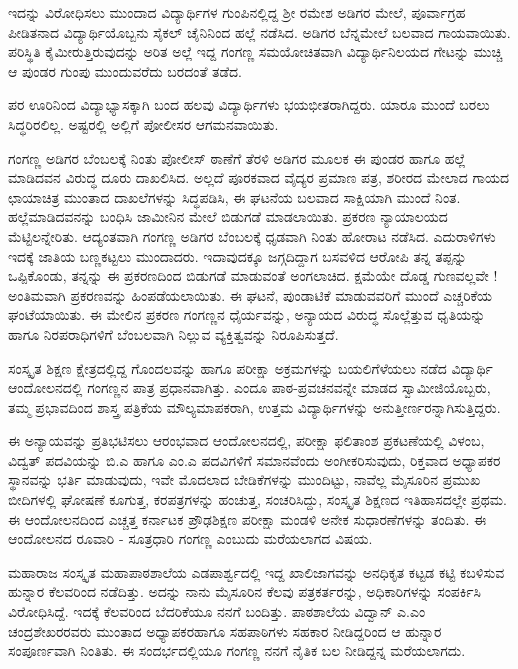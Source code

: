 ಇದನ್ನು ವಿರೋಧಿಸಲು ಮುಂದಾದ ವಿದ್ಯಾರ್ಥಿಗಳ ಗುಂಪಿನಲ್ಲಿದ್ದ ಶ್ರೀ ರಮೇಶ ಅಡಿಗರ ಮೇಲೆ, ಪೂರ್ವಾಗ್ರಹ ಪೀಡಿತನಾದ ವಿದ್ಯಾರ್ಥಿಯೊಬ್ಬನು ಸೈಕಲ್ ಚೈನಿನಿಂದ ಹಲ್ಲೆ ನಡೆಸಿದ. ಅಡಿಗರ ಬೆನ್ನಮೇಲೆ ಬಲವಾದ ಗಾಯವಾಯಿತು. ಪರಿಸ್ಥಿತಿ ಕೈಮೀರುತ್ತಿರುವುದನ್ನು ಅರಿತ ಅಲ್ಲೆ ಇದ್ದ ಗಂಗಣ್ಣ ಸಮಯೋಚಿತವಾಗಿ ವಿದ್ಯಾರ್ಥಿನಿಲಯದ ಗೇಟನ್ನು ಮುಚ್ಚಿ ಆ ಪುಂಡರ ಗುಂಪು ಮುಂದುವರೆದು ಬರದಂತೆ ತಡೆದ.

ಪರ ಊರಿನಿಂದ ವಿದ್ಯಾಭ್ಯಾಸಕ್ಕಾಗಿ ಬಂದ ಹಲವು ವಿದ್ಯಾರ್ಥಿಗಳು ಭಯಭೀತರಾಗಿದ್ದರು. ಯಾರೂ ಮುಂದೆ ಬರಲು ಸಿದ್ಧರಿರಲಿಲ್ಲ. ಅಷ್ಟರಲ್ಲಿ ಅಲ್ಲಿಗೆ ಪೋಲೀಸರ ಆಗಮನವಾಯಿತು. 

ಗಂಗಣ್ಣ ಅಡಿಗರ ಬೆಂಬಲಕ್ಕೆ ನಿಂತು ಪೋಲೀಸ್ ಠಾಣೆಗೆ ತೆರಳಿ ಅಡಿಗರ ಮೂಲಕ ಈ ಪುಂಡರ ಹಾಗೂ ಹಲ್ಲೆ ಮಾಡಿದವನ ವಿರುದ್ಧ ದೂರು ದಾಖಲಿಸಿದ. ಅಲ್ಲದೆ ಪೂರಕವಾದ ವೈದ್ಯರ ಪ್ರಮಾಣ ಪತ್ರ, ಶರೀರದ ಮೇಲಾದ ಗಾಯದ ಛಾಯಾಚಿತ್ರ ಮುಂತಾದ ದಾಖಲೆಗಳನ್ನು ಸಿದ್ಧಪಡಿಸಿ, ಈ ಘಟನೆಯ ಬಲವಾದ ಸಾಕ್ಷಿಯಾಗಿ ಮುಂದೆ ನಿಂತ. ಹಲ್ಲೆಮಾಡಿದವನನ್ನು ಬಂಧಿಸಿ ಜಾಮೀನಿನ ಮೇಲೆ ಬಿಡುಗಡೆ ಮಾಡಲಾಯಿತು. ಪ್ರಕರಣ ನ್ಯಾಯಾಲಯದ ಮೆಟ್ಟಿಲನ್ನೇರಿತು. ಆದ್ಯಂತವಾಗಿ ಗಂಗಣ್ಣ ಅಡಿಗರ ಬೆಂಬಲಕ್ಕೆ ಧೃಡವಾಗಿ ನಿಂತು ಹೋರಾಟ ನಡೆಸಿದ. ಎದುರಾಳಿಗಳು ಇದಕ್ಕೆ ಜಾತಿಯ ಬಣ್ಣಕಟ್ಟಲು ಮುಂದಾದರು. ಇದಾವುದಕ್ಕೂ ಜಗ್ಗದಿದ್ದಾಗ ಬಸವಳಿದ ಆರೋಪಿ ತನ್ನ ತಪ್ಪನ್ನು ಒಪ್ಪಿಕೊಂಡು, ತನ್ನನ್ನು ಈ ಪ್ರಕರಣದಿಂದ ಬಿಡುಗಡೆ ಮಾಡುವಂತೆ ಅಂಗಲಾಚಿದ. ಕ್ಷಮೆಯೇ ದೊಡ್ಡ ಗುಣವಲ್ಲವೇ ! ಅಂತಿಮವಾಗಿ ಪ್ರಕರಣವನ್ನು ಹಿಂಪಡೆಯಲಾಯಿತು. ಈ ಘಟನೆ, ಪುಂಡಾಟಿಕೆ ಮಾಡುವವರಿಗೆ ಮುಂದೆ ಎಚ್ಚರಿಕೆಯ ಘಂಟೆಯಾಯಿತು. ಈ ಮೇಲಿನ ಪ್ರಕರಣ ಗಂಗಣ್ಣನ ಧೈರ್ಯವನ್ನು, ಅನ್ಯಾಯದ ವಿರುದ್ಧ ಸೊಲ್ಲೆತ್ತುವ ಧೃತಿಯನ್ನು ಹಾಗೂ ನಿರಪರಾಧಿಗಳಿಗೆ ಬೆಂಬಲವಾಗಿ ನಿಲ್ಲುವ ವ್ಯಕ್ತಿತ್ವವನ್ನು ನಿರೂಪಿಸುತ್ತದೆ.  

ಸಂಸ್ಕೃತ ಶಿಕ್ಷಣ ಕ್ಷೇತ್ರದಲ್ಲಿದ್ದ ಗೊಂದಲವನ್ನು ಹಾಗೂ ಪರೀಕ್ಷಾ ಅಕ್ರಮಗಳನ್ನು ಬಯಲಿಗೆಳೆಯಲು ನಡೆದ ವಿದ್ಯಾರ್ಥಿ ಆಂದೋಲನದಲ್ಲಿ ಗಂಗಣ್ಣನ ಪಾತ್ರ ಪ್ರಧಾನವಾಗಿತ್ತು. ಎಂದೂ ಪಾಠ-ಪ್ರವಚನವನ್ನೇ ಮಾಡದ ಸ್ವಾಮೀಜಿಯೊಬ್ಬರು, ತಮ್ಮ  ಪ್ರಭಾವದಿಂದ ಶಾಸ್ತ್ರ ಪತ್ರಿಕೆಯ ಮೌಲ್ಯಮಾಪಕರಾಗಿ, ಉತ್ತಮ ವಿದ್ಯಾರ್ಥಿಗಳನ್ನು ಅನುತ್ತೀರ್ಣರನ್ನಾಗಿಸುತ್ತಿದ್ದರು. 

ಈ ಅನ್ಯಾಯವನ್ನು ಪ್ರತಿಭಟಿಸಲು ಆರಂಭವಾದ ಆಂದೋಲನದಲ್ಲಿ, ಪರೀಕ್ಷಾ ಫಲಿತಾಂಶ ಪ್ರಕಟಣೆಯಲ್ಲಿ ವಿಳಂಬ, ವಿದ್ವತ್ ಪದವಿಯನ್ನು ಬಿ.ಎ  ಹಾಗೂ  ಎಂ.ಎ ಪದವಿಗಳಿಗೆ ಸಮಾನವೆಂದು ಅಂಗೀಕರಿಸುವುದು, ರಿಕ್ತವಾದ ಅಧ್ಯಾಪಕರ ಸ್ಥಾನವನ್ನು  ಭರ್ತಿ ಮಾಡುವುದು, ಇವೇ ಮೊದಲಾದ ಬೇಡಿಕೆಗಳನ್ನು ಮುಂದಿಟ್ಟು, ನಾವೆಲ್ಲ ಮೈಸೂರಿನ ಪ್ರಮುಖ ಬೀದಿಗಳಲ್ಲಿ ಘೋಷಣೆ ಕೂಗುತ್ತ, ಕರಪತ್ರಗಳನ್ನು ಹಂಚುತ್ತ, ಸಂಚರಿಸಿದ್ದು, ಸಂಸ್ಕೃತ ಶಿಕ್ಷಣದ ಇತಿಹಾಸದಲ್ಲೇ ಪ್ರಥಮ. ಈ ಆಂದೋಲನದಿಂದ ಎಚ್ಚತ್ತ ಕರ್ನಾಟಕ ಪ್ರೌಢಶಿಕ್ಷಣ ಪರೀಕ್ಷಾ ಮಂಡಳಿ ಅನೇಕ ಸುಧಾರಣೆಗಳನ್ನು ತಂದಿತು. ಈ ಆಂದೋಲನದ ರೂವಾರಿ - ಸೂತ್ರಧಾರಿ ಗಂಗಣ್ಣ  ಎಂಬುದು ಮರೆಯಲಾಗದ ವಿಷಯ.

ಮಹಾರಾಜ ಸಂಸ್ಕೃತ ಮಹಾಪಾಠಶಾಲೆಯ ಎಡಪಾರ್ಶ್ವದಲ್ಲಿ ಇದ್ದ ಖಾಲಿಜಾಗವನ್ನು ಅನಧಿಕೃತ ಕಟ್ಟಡ ಕಟ್ಟಿ ಕಬಳಿಸುವ ಹುನ್ನಾರ ಕೆಲವರಿಂದ ನಡೆದಿತ್ತು. ಅದನ್ನು ನಾನು ಮೈಸೂರಿನ ಕೆಲವು  ಪತ್ರಕರ್ತರನ್ನು, ಅಧಿಕಾರಿಗಳನ್ನು ಸಂಪರ್ಕಿಸಿ ವಿರೋಧಿಸಿದ್ದೆ. ಇದಕ್ಕೆ ಕೆಲವರಿಂದ ಬೆದರಿಕೆಯೂ ನನಗೆ ಬಂದಿತ್ತು. ಪಾಠಶಾಲೆಯ ವಿದ್ವಾನ್ ಎ.ಎಂ ಚಂದ್ರಶೇಖರರವರು ಮುಂತಾದ ಅಧ್ಯಾಪಕರಹಾಗೂ ಸಹಪಾಠಿಗಳು ಸಹಕಾರ ನೀಡಿದ್ದರಿಂದ ಆ ಹುನ್ನಾರ ಸಂಪೂರ್ಣವಾಗಿ ನಿಂತಿತು. ಈ ಸಂದರ್ಭದಲ್ಲಿಯೂ ಗಂಗಣ್ಣ ನನಗೆ ನೈತಿಕ ಬಲ ನೀಡಿದ್ದನ್ನ ಮರೆಯಲಾಗದು.


